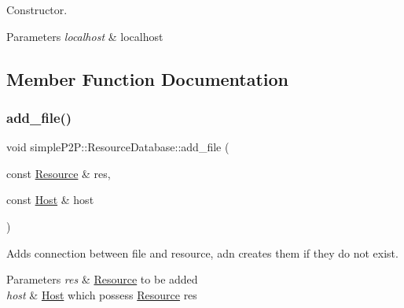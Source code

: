 Constructor. 


\begin{DoxyParams}{Parameters}
{\em localhost} & localhost \\
\hline
\end{DoxyParams}


\subsection{Member Function Documentation}
\mbox{\label{classsimpleP2P_1_1ResourceDatabase_aa2d77490749129d0b8cd2b5abe9aec68}} 
\subsubsection{\texorpdfstring{add\+\_\+file()}{add\_file()}\hspace{0.1cm}{\footnotesize\ttfamily [1/2]}}
{\footnotesize\ttfamily void simple\+P2\+P\+::\+Resource\+Database\+::add\+\_\+file (\begin{DoxyParamCaption}\item[{const \hyperlink{classsimpleP2P_1_1Resource}{Resource} \&}]{res,  }\item[{const \hyperlink{classsimpleP2P_1_1Host}{Host} \&}]{host }\end{DoxyParamCaption})}



Adds connection between file and resource, adn creates them if they do not exist. 


\begin{DoxyParams}{Parameters}
{\em res} & \hyperlink{classsimpleP2P_1_1Resource}{Resource} to be added \\
\hline
{\em host} & \hyperlink{classsimpleP2P_1_1Host}{Host} which possess \hyperlink{classsimpleP2P_1_1Resource}{Resource} res \\
\hline
\end{DoxyParams}
\mbox{\label{classsimpleP2P_1_1ResourceDatabase_a837b7ec01d60df86d1f6b66350f7c78b}} 
